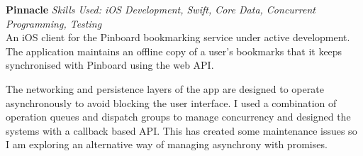 \textbf{Pinnacle}  \newline
\textit{Skills Used: iOS Development, Swift, Core Data, Concurrent Programming, Testing} \\
An iOS client for the Pinboard bookmarking service under active development. The
application maintains an offline copy of a user's bookmarks that it keeps
synchronised with Pinboard using the web API.

The networking and persistence layers of the app are designed to operate
asynchronously to avoid blocking the user interface. I used a combination of
operation queues and dispatch groups to manage concurrency and designed the
systems with a callback based API. This has created some maintenance issues so I
am exploring an alternative way of managing asynchrony with promises.

